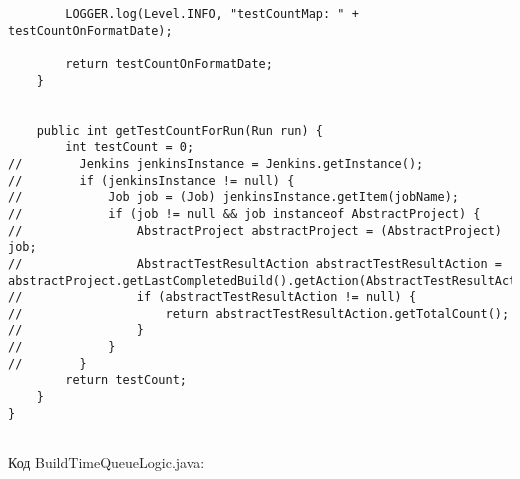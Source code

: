 \begin{lstlisting}
        LOGGER.log(Level.INFO, "testCountMap: " + testCountOnFormatDate);

        return testCountOnFormatDate;
    }


    public int getTestCountForRun(Run run) {
        int testCount = 0;
//        Jenkins jenkinsInstance = Jenkins.getInstance();
//        if (jenkinsInstance != null) {
//            Job job = (Job) jenkinsInstance.getItem(jobName);
//            if (job != null && job instanceof AbstractProject) {
//                AbstractProject abstractProject = (AbstractProject) job;
//                AbstractTestResultAction abstractTestResultAction = abstractProject.getLastCompletedBuild().getAction(AbstractTestResultAction.class);
//                if (abstractTestResultAction != null) {
//                    return abstractTestResultAction.getTotalCount();
//                }
//            }
//        }
        return testCount;
    }
}


\end{lstlisting}

Код BuildTimeQueueLogic.java:

